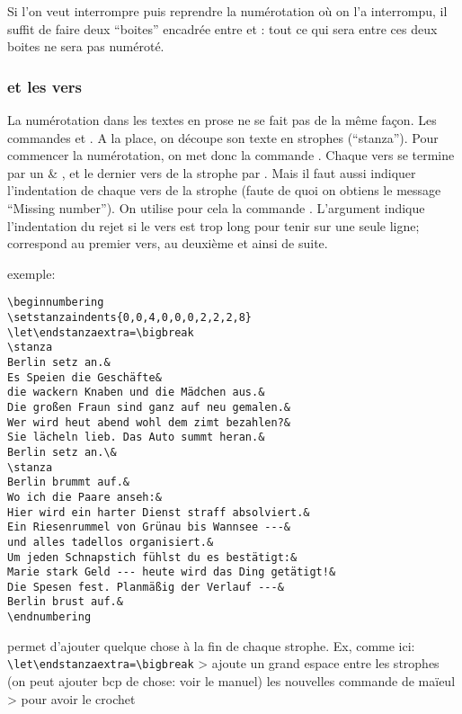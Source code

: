 
Si l'on veut interrompre puis reprendre la numérotation où on l'a interrompu, il suffit de faire deux \enquote{boites} encadrée entre  et :  tout ce qui sera entre ces deux boites ne sera pas numéroté.

\subsubsection{ et les vers}

La  numérotation dans les textes en prose ne se fait pas de la même façon. Les commandes  et . A la place, on découpe son texte en strophes (\enquote{stanza}). Pour commencer la numérotation, on met donc la commande . Chaque vers se termine par un & , et le dernier vers de la strophe par \cs{&}.  Mais il faut aussi indiquer l'indentation de chaque vers de la strophe (faute de quoi on obtiens le message \enquote{Missing number}). On utilise pour cela la commande . L'argument  indique l'indentation du rejet si le vers est trop long pour tenir sur une seule ligne;  correspond au premier vers,  au deuxième et ainsi de suite.


exemple: 

\begin{verbatim}
\beginnumbering
\setstanzaindents{0,0,4,0,0,0,2,2,2,8}
\let\endstanzaextra=\bigbreak
\stanza
Berlin setz an.&
Es Speien die Geschäfte&
die wackern Knaben und die Mädchen aus.&
Die großen Fraun sind ganz auf neu gemalen.&
Wer wird heut abend wohl dem zimt bezahlen?&
Sie lächeln lieb. Das Auto summt heran.&
Berlin setz an.\&
\stanza
Berlin brummt auf.&
Wo ich die Paare anseh:&
Hier wird ein harter Dienst straff absolviert.&
Ein Riesenrummel von Grünau bis Wannsee ---&
und alles tadellos organisiert.&
Um jeden Schnapstich fühlst du es bestätigt:&
Marie stark Geld --- heute wird das Ding getätigt!&
Die Spesen fest. Planmäßig der Verlauf ---&
Berlin brust auf.&
\endnumbering
\end{verbatim}


\cs{\endstanzaextra} permet d'ajouter quelque chose à la fin de chaque strophe.
Ex, comme ici: 
\verb|\let\endstanzaextra=\bigbreak| > ajoute un grand espace entre les strophes
(on peut ajouter bcp de chose: voir le manuel)
les nouvelles commande de maïeul > pour avoir le crochet


